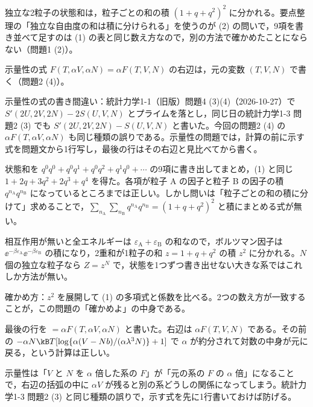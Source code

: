 \begin{daiji}
  \item 独立な2粒子の状態和は，粒子ごとの和の積 $(1+q+q^{2})^{2}$ に分かれる。要点整理の「独立な自由度の和は積に分けられる」を使うのが (2) の問いで，9項を書き並べて足すのは (1) の表と同じ数え方なので，別の方法で確かめたことにならない（問題1 (2)）。
  \item 示量性の式 $F(T,\alpha V,\alpha N)=\alpha F(T,V,N)$ の右辺は，元の変数 $(T,V,N)$ で書く（問題2 (4)）。
\end{daiji}
\begin{maemo}
  \item 示量性の式の書き間違い：統計力学1-1（旧版）問題4 (3)(4)（2026-10-27）で $S'(2U,2V,2N)-2S(U,V,N)$ とプライムを落とし，同じ日の統計力学1-3 問題2 (3) でも $S'(2U,2V,2N)-S(U,V,N)$ と書いた。今回の問題2 (4) の $\alpha F(T,\alpha V,\alpha N)$ も同じ種類の誤りである。示量性の問題では，計算の前に示す式を問題文から1行写し，最後の行はその右辺と見比べてから書く。
\end{maemo}
\begin{kotaeran}
   状態和を $q^{0}q^{0}+q^{0}q^{1}+q^{0}q^{2}+q^{1}q^{0}+\cdots$ の9項に書き出してまとめ，(1) と同じ $1+2q+3q^{2}+2q^{3}+q^{4}$ を得た。各項が粒子 A の因子と粒子 B の因子の積 $q^{n_{\mathrm{A}}}q^{n_{\mathrm{B}}}$ になっているところまでは正しい。しかし問いは「粒子ごとの和の積に分けて」求めることで，$\sum_{n_{\mathrm{A}}}\sum_{n_{\mathrm{B}}}q^{n_{\mathrm{A}}}q^{n_{\mathrm{B}}}=(1+q+q^{2})^{2}$ と積にまとめる式が無い。
\end{kotaeran}
\begin{rikai}
  \item 相互作用が無いと全エネルギーは $\varepsilon_{\mathrm{A}}+\varepsilon_{\mathrm{B}}$ の和なので，ボルツマン因子は $\ee^{-\beta\varepsilon_{\mathrm{A}}}\ee^{-\beta\varepsilon_{\mathrm{B}}}$ の積になり，2重和が1粒子の和 $z=1+q+q^{2}$ の積 $z^{2}$ に分かれる。$N$ 個の独立な粒子なら $Z=z^{N}$ で，状態を1つずつ書き出せない大きな系ではこれしか方法が無い。
  \item 確かめ方：$z^{2}$ を展開して (1) の多項式と係数を比べる。2つの数え方が一致することが，この問題の「確かめよ」の中身である。
\end{rikai}
\begin{kotaeran}
   最後の行を $=\alpha F(T,\alpha V,\alpha N)$ と書いた。右辺は $\alpha F(T,V,N)$ である。その前の $-\alpha N\kB T[\log\{\alpha(V-Nb)/(\alpha\lambda^{3}N)\}+1]$ で $\alpha$ が約分されて対数の中身が元に戻る，という計算は正しい。
\end{kotaeran}
\begin{rikai}
  \item 示量性は「$V$ と $N$ を $\alpha$ 倍した系の $F$」が「元の系の $F$ の $\alpha$ 倍」になることで，右辺の括弧の中に $\alpha V$ が残ると別の系どうしの関係になってしまう。統計力学1-3 問題2 (3) と同じ種類の誤りで，示す式を先に1行書いておけば防げる。
\end{rikai}
